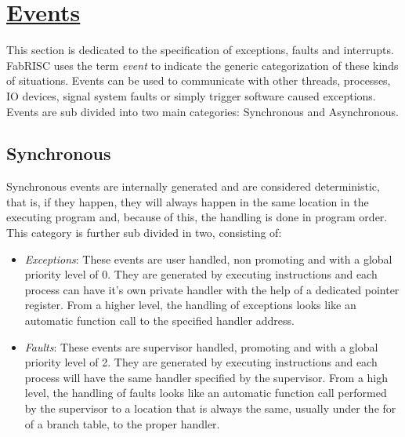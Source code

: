 \documentclass{article}
\begin{document}
    \clearpage

    \section[Events]{\LARGE\underline{Events}}

        This section is dedicated to the specification of exceptions, faults and interrupts. FabRISC uses the term \textit{event} to indicate the generic categorization of these kinds of situations. Events can be used to communicate with other threads, processes, IO devices, signal system faults or simply trigger software caused exceptions. Events are sub divided into two main categories: Synchronous and Asynchronous.

        \subsection{Synchronous}

            Synchronous events are internally generated and are considered deterministic, that is, if they happen, they will always happen in the same location in the executing program and, because of this, the handling is done in program order. This category is further sub divided in two, consisting of:

            \begin{itemize}

                \item \textit{Exceptions}: These events are user handled, non promoting and with a global priority level of 0. They are generated by executing instructions and each process can have it's own private handler with the help of a dedicated pointer register. From a higher level, the handling of exceptions looks like an automatic function call to the specified handler address.
                \item \textit{Faults}: These events are supervisor handled, promoting and with a global priority level of 2. They are generated by executing instructions and each process will have the same handler specified by the supervisor. From a high level, the handling of faults looks like an automatic function call performed by the supervisor to a location that is always the same, usually under the for of a branch table, to the proper handler.

            \end{itemize}
\end{document}
